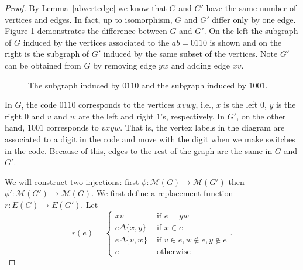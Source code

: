 \documentclass[12pt]{amsart}
\theoremstyle{plain}
\theoremstyle{definition}
\newcommand{\cM}{\mathcal{M}}
\begin{document}
\begin{proof}
By Lemma~\ref{abvertedge} we know that $G$ and $G'$ have the same number of vertices and edges.  In fact, up to isomorphism, $G$ and $G'$ differ only by one edge. Figure  \ref{fig:0110} demonstrates the difference between $G$ and $G'$.  On the left the subgraph of $G$ induced by the vertices associated to the $ab =0110$ is shown and on the right is the subgraph of $G'$ induced by the same subset of the vertices.  Note $G'$ can be obtained from $G$ by removing edge $yw$ and adding edge $xv$.

\begin{figure}[!ht]
\begin{center}
\caption{The subgraph induced by $0110$ and the subgraph induced by $1001$.}
\label{fig:0110}
\end{center}
\end{figure}

 In $G$, the code $0110$ corresponds to the vertices $xvwy$, i.e., $x$ is the left $0$, $y$ is the right $0$ and $v$ and $w$ are the left and right $1$'s, respectively.  
 In $G'$, on the other hand, $1001$ corresponds to $vxyw$.  That is, the vertex labels in the diagram are associated to a digit in the code and move with the digit when we make switches in the code.  Because of this, edges to the rest of the graph are the same in $G$ and $G'$. 
  
We will construct two injections: first $\phi: \cM(G)\to \cM(G')$  then $\phi':\cM(G') \to \cM(G)$. We first define a replacement function $r:E(G) \to E(G')$.  Let
 $$r(e)=
 \begin{cases}
 xv  &\text{ if } e=yw\\
 e\Delta\{x,y\} &\text{ if } x\in e\\
 e\Delta\{v,w\} &\text{ if } v\in e, w\notin e, y\notin e\\
 e  &\text{ otherwise}
 \end{cases}.$$  
 

\end{proof}
\end{document}
